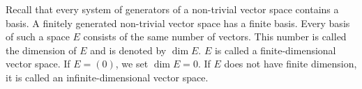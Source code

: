 Recall that every system of generators of a non-trivial vector space contains a basis. A finitely generated non-trivial vector space has a finite basis. Every basis of such a space $E$ consists of the same number of vectors. This number is called the dimension of $E$ and is denoted by $\dim E$. $E$ is called a finite-dimensional vector space. If $E = (0)$, we set $\dim E = 0$. If $E$ does not have finite dimension, it is called an infinite-dimensional vector space.

